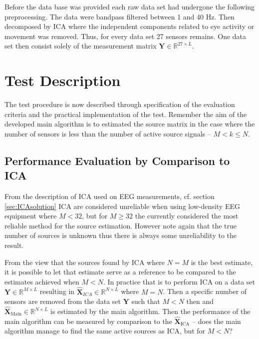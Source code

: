 Before the data base was provided each raw data set had undergone the following preprocessing.
The data were bandpass filtered between 1 and 40 Hz. Then decomposed by ICA where the independent components related to eye activity or movement was removed. Thus, for every data set 27 sensors remains. One data set then consist solely of the measurement matrix $\mathbf{Y} \in \mathbb{R}^{27\times L}$.


\section{Test Description}\label{seg:main_test_description}
The test procedure is now described through specification of the evaluation criteria and the practical implementation of the test.
Remember the aim of the developed main algorithm is to estimated the source matrix in the case where the number of sensors is less than the number of active source signals -- $M < k \leq N$.

\subsection{Performance Evaluation by Comparison to ICA}
From the description of ICA used on EEG measurements, cf. section \ref{sec:ICAsolution} ICA are considered unreliable when using low-density EEG equipment where $M<32$, but for $M \geq 32$ the currently considered the most reliable method for the source estimation. However note again that the true number of sources is unknown thus there is always some unreliability to the result. 

From the view that the sources found by ICA where $N=M$ is the best estimate, it is possible to let that estimate serve as a reference to be compared to the estimates achieved when $M<N$. 
In practice that is to perform ICA on a data set $\textbf{Y} \in \mathbb{R}^{M \times L}$ resulting in $\hat{\textbf{X}}_{ICA}\in \mathbb{R}^{N\times L}$ where $M=N$. 
Then a specific number of sensors are removed from the data set $\textbf{Y}$ such that $M<N$ then and $\hat{\textbf{X}}_{\text{Main}}\in \mathbb{R}^{N\times L}$ is estimated by the main algorithm. 
Then the performance of the main algorithm can be measured by comparison to the $\hat{\textbf{X}}_{\text{ICA}}$ -- does the main algorithm manage to find the same active sources as ICA, but for $M<N$?

